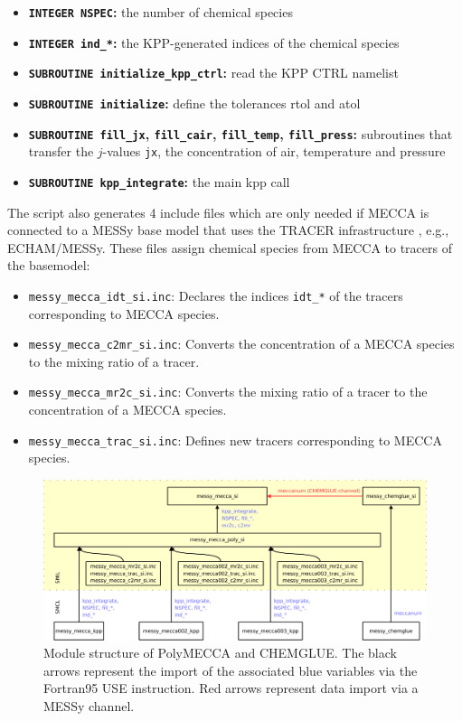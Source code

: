 \documentclass[a4paper,twoside]{article}
\begin{document}
\begin{itemize}
\item {\bf \verb|INTEGER NSPEC|:} the number of chemical species
\item {\bf \verb|INTEGER ind_*|:} the KPP-generated indices of the
  chemical species
\item {\bf \verb|SUBROUTINE initialize_kpp_ctrl|:} read the KPP CTRL
  namelist
\item {\bf \verb|SUBROUTINE initialize|:} define the tolerances rtol and
  atol
\item {\bf \verb|SUBROUTINE fill_jx|, \verb|fill_cair|,
    \verb|fill_temp|, \verb|fill_press|:} subroutines that transfer the
  $j$-values \verb|jx|, the concentration of air, temperature and
  pressure
\item {\bf \verb|SUBROUTINE kpp_integrate|:} the main kpp call
\end{itemize}

The script  also generates 4 include files which are only
needed if MECCA is connected to a MESSy base model that uses the TRACER
infrastructure \citep{2097}, e.g., ECHAM/MESSy. These files assign
chemical species from MECCA to tracers of the basemodel:

\begin{itemize}
\item \verb|messy_mecca_idt_si.inc|: Declares the indices \verb|idt_*|
  of the tracers corresponding to MECCA species.
\item \verb|messy_mecca_c2mr_si.inc|: Converts the concentration of a
  MECCA species to the mixing ratio of a tracer.
\item \verb|messy_mecca_mr2c_si.inc|: Converts the mixing ratio of a
  tracer to the concentration of a MECCA species.
\item \verb|messy_mecca_trac_si.inc|: Defines new tracers corresponding
  to MECCA species.
\end{itemize}

\begin{figure}
  \begin{center}
    \includegraphics[width=\textwidth]{polymecca_use_diagr}
  \end{center}
  \caption{Module structure of PolyMECCA and CHEMGLUE. The black arrows
    represent the import of the associated blue variables via the
    Fortran95 USE instruction. Red arrows represent data import via a
    MESSy channel.}
  \label{fig:polymeccause}
\end{figure}
\end{document}
